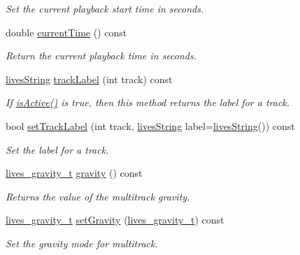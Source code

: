 \begin{DoxyCompactItemize}
\begin{DoxyCompactList}\small\item\em Set the current playback start time in seconds. \end{DoxyCompactList}\item 
double \hyperlink{classlives_1_1multitrack_a30f00aaa45426e7035cab06878481ccb}{current\-Time} () const 
\begin{DoxyCompactList}\small\item\em Return the current playback time in seconds. \end{DoxyCompactList}\item 
\hyperlink{classlives_1_1livesString}{lives\-String} \hyperlink{classlives_1_1multitrack_acae4482fa4581f46fec031459c1c82e5}{track\-Label} (int track) const 
\begin{DoxyCompactList}\small\item\em If \hyperlink{classlives_1_1multitrack_adeb7b705e8e050f64673e938dddf2e36}{is\-Active()} is true, then this method returns the label for a track. \end{DoxyCompactList}\item 
bool \hyperlink{classlives_1_1multitrack_a50d2874d3db625d3cc2ea50f2d0e6e87}{set\-Track\-Label} (int track, \hyperlink{classlives_1_1livesString}{lives\-String} label=\hyperlink{classlives_1_1livesString}{lives\-String}()) const 
\begin{DoxyCompactList}\small\item\em Set the label for a track. \end{DoxyCompactList}\item 
\hyperlink{liblives_8hpp_a85e44abde9be7196c1da9fd5922b7558}{lives\-\_\-gravity\-\_\-t} \hyperlink{classlives_1_1multitrack_a9bf9b673e0a9b38e9e9c6e08d93ce9e7}{gravity} () const 
\begin{DoxyCompactList}\small\item\em Returns the value of the multitrack gravity. \end{DoxyCompactList}\item 
\hyperlink{liblives_8hpp_a85e44abde9be7196c1da9fd5922b7558}{lives\-\_\-gravity\-\_\-t} \hyperlink{classlives_1_1multitrack_a7b2751e2cdafd83bb61956d3ef8dbf75}{set\-Gravity} (\hyperlink{liblives_8hpp_a85e44abde9be7196c1da9fd5922b7558}{lives\-\_\-gravity\-\_\-t}) const 
\begin{DoxyCompactList}\small\item\em Set the gravity mode for multitrack. \end{DoxyCompactList}\item 

\end{DoxyCompactItemize}
